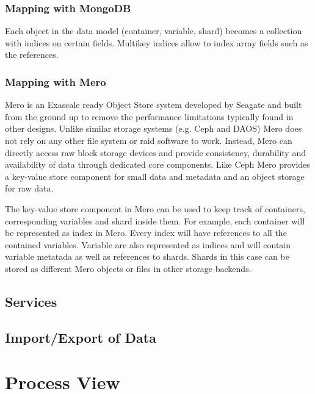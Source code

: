 \documentclass{../../template/esiwace-report}
\begin{document}
\subsubsection{Mapping with MongoDB}
Each object in the data model (container, variable, shard) becomes a collection with indices on certain fields.
Multikey indices allow to index array fields such as the references.

\subsubsection{Mapping with Mero}
Mero is an Exascale ready Object Store system developed by Seagate and built from the ground up to remove the performance 
limitations typically found in other designs. Unlike similar storage systems (e.g. Ceph and DAOS) Mero does not rely on any other 
file system or raid software to work. Instead, Mero can directly access raw block storage devices and provide consistency,
durability and availability of data through dedicated core components. Like Ceph Mero provides a key-value store component for small 
data and metadata and an object storage for raw data.

The key-value store component in Mero can be used to keep track of containers, corresponding variables and shard inside them.
For example, each container will be represented as index in Mero. Every index will have references to all the contained variables.
Variable are also represented as indices and will contain variable metatada as well as references to shards. Shards in this case
can be stored as different Mero objects or files in other storage backends.


\subsection{Services}

\todo{}

\subsection{Import/Export of Data}

\todo{}

\section{Process View}%
\end{document}
